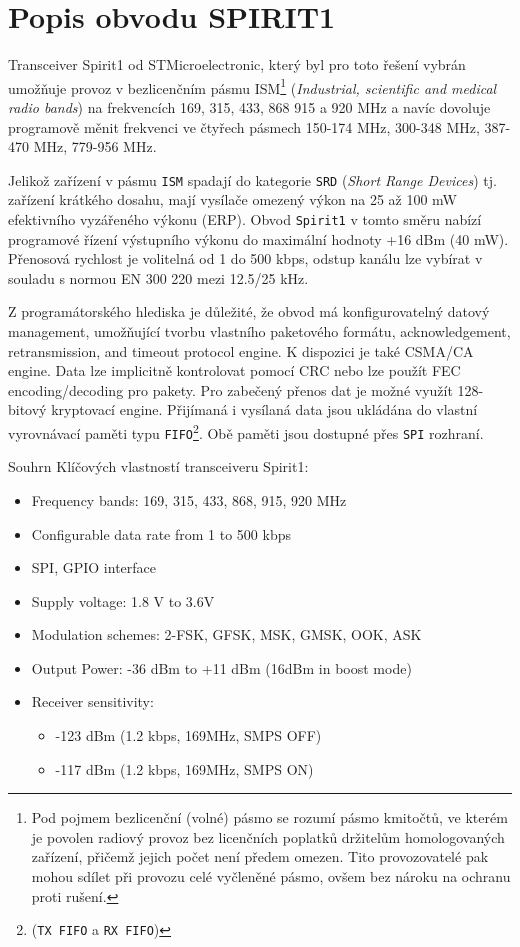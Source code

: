   \section{Popis obvodu SPIRIT1}
    Transceiver Spirit1 od STMicroelectronic, který byl pro toto řešení vybrán umožňuje provoz v 
    bezlicenčním pásmu ISM\footnote{Pod pojmem bezlicenční (volné) pásmo se rozumí pásmo kmitočtů, 
    ve kterém je povolen radiový provoz bez licenčních poplatků držitelům homologovaných zařízení, 
    přičemž jejich počet není předem omezen. Tito provozovatelé pak mohou sdílet při provozu celé 
    vyčleněné pásmo, ovšem bez nároku na ochranu proti rušení.} (\emph{Industrial, scientific and 
    medical radio bands}) na frekvencích 169, 315, 433, 868 915 a 920 MHz a navíc dovoluje 
    programově měnit frekvenci ve čtyřech pásmech 150-174 MHz, 300-348 MHz, 387-470 MHz, 779-956 
    MHz. %
    
    Jelikož zařízení v pásmu \texttt{ISM} spadají do kategorie \texttt{SRD} (\emph{Short Range 
    Devices}) tj. zařízení krátkého dosahu, mají vysílače omezený výkon na 25 až 100 mW efektivního 
    vyzářeného výkonu (ERP). Obvod \texttt{Spirit1} v tomto směru nabízí programové řízení 
    výstupního výkonu do maximální hodnoty +16 dBm (40 mW). Přenosová rychlost je volitelná od 1 do 
    500 kbps, odstup kanálu lze vybírat v souladu s normou EN 300 220 mezi 12.5/25 kHz.
    
    Z programátorského hlediska je důležité, že obvod má konfigurovatelný datový management, 
    umožňující tvorbu vlastního paketového formátu, acknowledgement, retransmission, and timeout 
    protocol engine. K dispozici je také CSMA/CA engine. Data lze implicitně kontrolovat pomocí CRC 
    nebo lze  použít FEC encoding/decoding pro pakety. Pro zabečený přenos dat je možné využít 
    128-bitový kryptovací engine. Přijímaná i vysílaná data jsou ukládána do vlastní vyrovnávací 
    paměti typu \texttt{FIFO}\footnote{(\texttt{TX FIFO} a \texttt{RX FIFO})}. Obě paměti jsou  
    dostupné přes \texttt{SPI} rozhraní.

    Souhrn Klíčových vlastností transceiveru Spirit1:
      \begin{itemize}[noitemsep]
        \item Frequency bands: 169, 315, 433, 868, 915, 920 MHz
        \item Configurable data rate from 1 to 500 kbps
        \item SPI, GPIO interface
        \item Supply voltage: 1.8 V to 3.6V
        \item Modulation schemes: 2-FSK, GFSK, MSK, GMSK, OOK, ASK  
        \item Output Power: -36 dBm to +11 dBm (16dBm in boost mode)
        \item Receiver sensitivity: 
          \begin{itemize}
            \item -123 dBm (1.2 kbps, 169MHz, SMPS OFF)
            \item -117 dBm (1.2 kbps, 169MHz, SMPS ON)
          \end{itemize}  
      \end{itemize}
    
